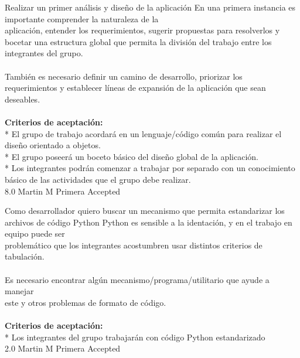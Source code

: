 	{Realizar un primer análisis y diseño de la aplicación} %
	{En una primera instancia es importante comprender la naturaleza de la\\
aplicación, entender los requerimientos, sugerir propuestas para resolverlos y\\
bocetar una estructura global que permita la división del trabajo entre los\\
integrantes del grupo.\\
  \\
También es necesario definir un camino de desarrollo, priorizar los\\
requerimientos y establecer líneas de expansión de la aplicación que sean\\
deseables.\\
  \\
\textbf{Criterios de aceptación:}\\
* El grupo de trabajo acordará en un lenguaje/código común para realizar el diseño orientado a objetos.  \\
* El grupo poseerá un boceto básico del diseño global de la aplicación.  \\
* Los integrantes podrán comenzar a trabajar por separado con un conocimiento básico de las actividades que el grupo debe realizar.  \\
} %
	{} %
	{8.0} %
	{Martin M} %
	{Primera} %
	{Accepted} %


\vspace{20pt}

	{Como desarrollador quiero buscar un mecanismo que permita estandarizar los archivos de código Python} %
	{Python es sensible a la identación, y en el trabajo en equipo puede ser\\
problemático que los integrantes acostumbren usar distintos criterios de\\
tabulación.\\
  \\
Es necesario encontrar algún mecanismo/programa/utilitario que ayude a manejar\\
este y otros problemas de formato de código.\\
  \\
\textbf{Criterios de aceptación:}\\
* Los integrantes del grupo trabajarán con código Python estandarizado  \\
} %
	{} %
	{2.0} %
	{Martin M} %
	{Primera} %
	{Accepted} %


